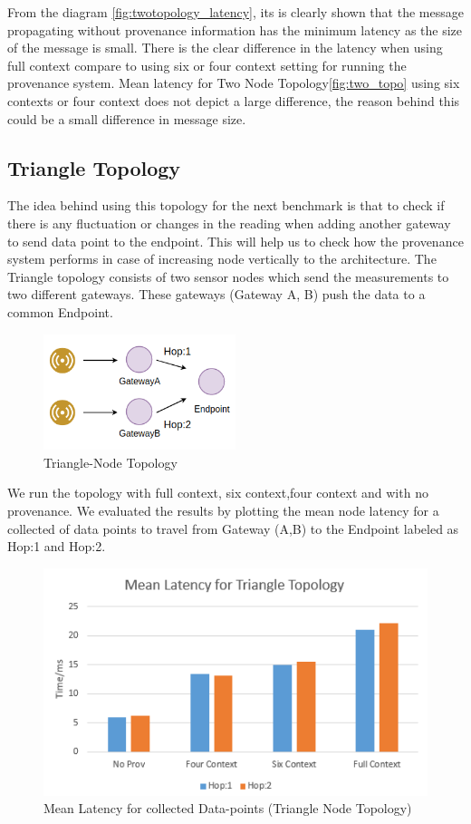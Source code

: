 From the diagram \ref{fig:twotopology_latency}, its is clearly shown that the message propagating without provenance information has the minimum latency as the size of the message is small. There is the clear difference in the latency when using full context compare to using six or four context setting for running the provenance system. Mean latency for Two Node Topology\ref{fig:two_topo} using six contexts or four context does not depict a large difference, the reason behind this could be a small difference in message size.


\subsection*{Triangle Topology}The idea behind using this topology for the next benchmark is that to check if there is any fluctuation or changes in the reading when adding another gateway to send data point to the endpoint. This will help us to check how the provenance system performs in case of increasing node vertically to the architecture. The Triangle topology consists of two sensor nodes which send the measurements to two different gateways. These gateways (Gateway A, B) push the data to a common Endpoint.

\begin{figure}[H]
	\center
	\includegraphics[width=0.5\textwidth]{figures/latencytopo_triangle.png}
	\caption{Triangle-Node Topology}
	\label{fig:triangle_topo}
\end{figure}

We run the topology with full context, six context,four context and with no provenance. We evaluated the results by plotting the mean node latency for a collected of data points
to travel from Gateway (A,B) to the Endpoint labeled as Hop:1  and Hop:2.
\begin{figure}[H]
	\center
	\includegraphics[width=\textwidth]{figures/triangletopology_latency.PNG}
	\caption{Mean Latency for collected Data-points  (Triangle Node Topology)}
	\label{fig:triangletopology_latency}
\end{figure}


